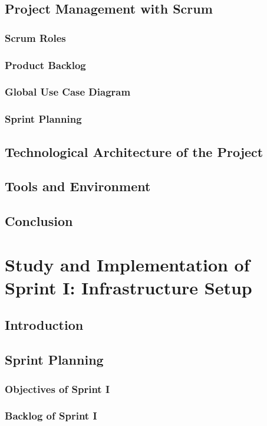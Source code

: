 \documentclass[a4paper,12pt]{report}
\begin{document}
\section{Project Management with Scrum}
\subsection{Scrum Roles}
\subsection{Product Backlog}
\subsection{Global Use Case Diagram}
\subsection{Sprint Planning}
\section{Technological Architecture of the Project}
\section{Tools and Environment}
\section{Conclusion}

\chapter[Sprint I]{Study and Implementation of Sprint I: Infrastructure Setup}

\minitoc
\section{Introduction}
\section{Sprint Planning}
\subsection{Objectives of Sprint I}
\subsection{Backlog of Sprint I}
\end{document}
